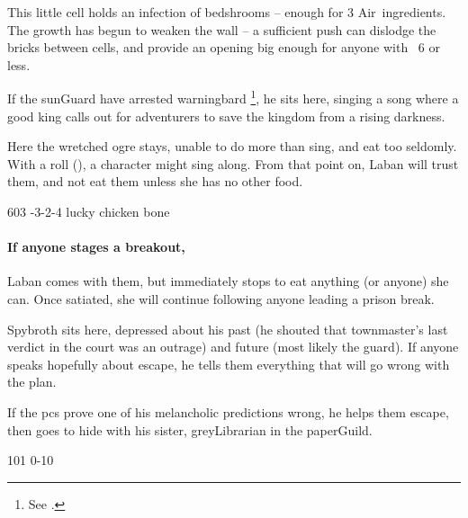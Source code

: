 \begin{multicols}{2}


This little cell holds an infection of \glspl{bedshroom} -- enough for 3 Air~\glspl{ingredient}.
The growth has begun to weaken the wall -- a sufficient push can dislodge the bricks between cells, and provide an opening big enough for anyone with ~6 or less.


If the \gls{sunGuard} have arrested \gls{warningbard}%
\footnote{See .},
he sits here, singing a song where a good king calls out for adventurers to save the kingdom from a rising darkness.


Here the wretched \gls{ogre} stays, unable to do more than sing, and eat too seldomly.
With a  roll (\tn[5]), a character might sing along.
From that point on, Laban will trust them, and not eat them unless she has no other food.

%
  {{6}{0}{3}}%
  {{-3}{-2}{-4}}%
  {%
  }%
  {}%
  {lucky chicken bone}%
  {}%

\paragraph{If anyone stages a breakout,}
Laban comes with them, but immediately stops to eat anything (or anyone) she can.
Once satiated, she will continue following anyone leading a prison break.


Spybroth sits here, depressed about his past (he shouted that \gls{townmaster}'s last verdict in the \gls{court} was an outrage) and future (most likely the \gls{guard}).
If anyone speaks hopefully about escape, he tells them everything that will go wrong with the plan.

If the \glspl{pc} prove one of his melancholic predictions wrong, he helps them escape, then goes to hide with his sister, \gls{greyLibrarian} in the \gls{paperGuild}.

%
  {{1}{0}{1}}%
  {{0}{-1}{0}}%
  {%
  }%
  {}%
  {\lootSmall}%
  {}%


\end{multicols}
